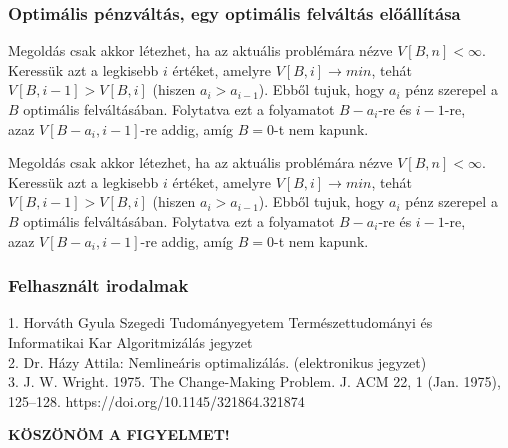 \documentclass{beamer}
\begin{document}
\begin{frame}
    \frametitle{Optimális pénzváltás, egy optimális felváltás előállítása}
    Megoldás csak akkor létezhet, ha az aktuális problémára nézve \(V[B,n]<\infty\). \newline
    Keressük azt a legkisebb \(i\) értéket, amelyre \(V[B,i]\rightarrow min\), tehát $V[B,i-1]>V[B,i]$ (hiszen $a_i>a_{i-1}$). \newline
    Ebből tujuk, hogy \(a_i\) pénz szerepel a \(B\) optimális felváltásában.\newline
    Folytatva ezt a folyamatot \(B-a_i\)-re és \(i-1\)-re,\\ azaz $V[B-a_i,i-1]$-re addig, amíg $B=0$-t nem kapunk.
\end{frame}
\begin{frame}
    
    Megoldás csak akkor létezhet, ha az aktuális problémára nézve \(V[B,n]<\infty\). \newline
    Keressük azt a legkisebb \(i\) értéket, amelyre \(V[B,i]\rightarrow min\), tehát $V[B,i-1]>V[B,i]$ (hiszen $a_i>a_{i-1}$). \newline
    Ebből tujuk, hogy \(a_i\) pénz szerepel a \(B\) optimális felváltásában.\newline
    Folytatva ezt a folyamatot \(B-a_i\)-re és \(i-1\)-re,\\ azaz $V[B-a_i,i-1]$-re addig, amíg $B=0$-t nem kapunk.
\end{frame}
\begin{frame}
    \frametitle{Felhasznált irodalmak}
    1. Horváth Gyula Szegedi Tudományegyetem Természettudományi és Informatikai Kar Algoritmizálás jegyzet\\
    2. Dr. Házy Attila: Nemlineáris optimalizálás. (elektronikus jegyzet)\\
    3. J. W. Wright. 1975. The Change-Making Problem. J. ACM 22, 1 (Jan. 1975), 125–128. https://doi.org/10.1145/321864.321874\\
\end{frame}
\begin{frame}
    \textbf{KÖSZÖNÖM A FIGYELMET!}
\end{frame}
\end{document}
